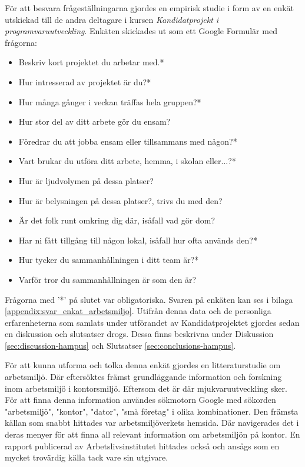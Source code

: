 För att besvara frågeställningarna gjordes en empirisk studie i form av en enkät utskickad till de andra deltagare i kursen \textit{Kandidatprojekt i programvaruutveckling}. Enkäten skickades ut som ett Google Formulär \cite{GForms} med frågorna:
\begin{itemize}
\item Beskriv kort projektet du arbetar med.*
\item Hur intresserad av projektet är du?*
\item Hur många gånger i veckan träffas hela gruppen?*
\item Hur stor del av ditt arbete gör du ensam?
\item Föredrar du att jobba ensam eller tillsammans med någon?*
\item Vart brukar du utföra ditt arbete, hemma, i skolan eller...?*
\item Hur är ljudvolymen på dessa platser?
\item Hur är belysningen på dessa platser?, trivs du med den?
\item Är det folk runt omkring dig där, isåfall vad gör dom?
\item Har ni fått tillgång till någon lokal, isåfall hur ofta används den?*
\item Hur tycker du sammanhållningen i ditt team är?*
\item Varför tror du sammanhållningen är som den är?
\end{itemize}
Frågorna med '*' på slutet var obligatoriska. Svaren på enkäten kan ses i bilaga \ref{appendix:svar_enkat_arbetsmiljo}. Utifrån denna data och de personliga erfarenheterna som samlats under utförandet av Kandidatprojektet gjordes sedan en diskussion och slutsatser drogs. Dessa finns beskrivna under Diskussion \ref{sec:discussion-hampus} och Slutsatser \ref{sec:conclusions-hampus}.

För att kunna utforma och tolka denna enkät gjordes en litteraturstudie om arbetsmiljö. Där eftersöktes främst grundläggande information och forskning inom arbetsmiljö i kontorsmiljö. Eftersom det är där mjukvaruutveckling sker. För att finna denna information användes sökmotorn Google med sökorden "arbetsmiljö", "kontor", "dator", "små företag" i olika kombinationer. Den främsta källan som snabbt hittades var arbetsmiljöverkets hemsida. Där navigerades det i deras menyer för att finna all relevant information om arbetsmiljön på kontor. En rapport publicerad av Arbetslivsinstitutet hittades också och ansågs som en mycket trovärdig källa tack vare sin utgivare. 

